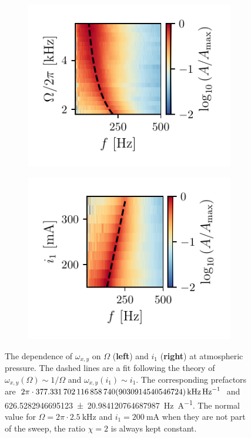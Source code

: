 \begin{figure}
    \centering
    \begin{subfigure}{0.45\textwidth}
        \includegraphics{figures/xy_mode_dependence_on_driving_frequency.pdf}
    \end{subfigure}
    \begin{subfigure}{0.45\textwidth}
        \includegraphics{figures/xy_mode_dependence_on_inner_current.pdf}
    \end{subfigure}
    \caption{The dependence of $\omega_{x,y}$ on $\Omega$ (\textbf{left}) and $i_1$ (\textbf{right}) at atmospheric pressure. The dashed lines are a fit following the theory of $\omega_{x,y}(\Omega) \sim 1 / \Omega$ and $\omega_{x,y}(i_1) \sim i_1$. The corresponding prefactors are $2\pi \cdot \qty{377.33170211685874\pm9.030914540546724}{\kilo\hertz\per\hertz}$ and \qty{626.5282946695123\pm20.984120764687987}{\hertz\per\ampere}. The normal value for $\Omega = 2\pi \cdot \qty{2.5}{\kilo\hertz}$ and $i_1 = \qty{200}{\milli\ampere}$ when they are not part of the sweep, the ratio $\chi = 2$ is always kept constant.}
    \label{fig:xy-mode-dependence-1bar}
\end{figure}

